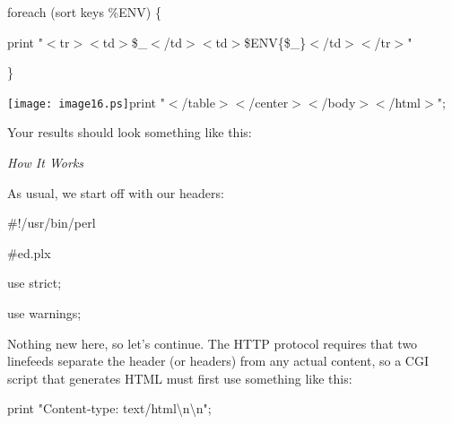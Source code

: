 \documentclass[a4paper,11pt]{book}
\begin{document}
\noindent foreach (sort keys \%ENV) \{

\noindent print "$<$tr$>$$<$td$>$\$\_$<$/td$>$$<$td$>$\$ENV\{\$\_\}$<$/td$>$$<$/tr$>$"

\noindent \}

\noindent \texttt{[image: image16.ps]}print "$<$/table$>$$<$/center$>$$<$/body$>$$<$/html$>$";

\noindent 

\noindent Your results should look something like this:

\noindent 

\noindent 

\noindent 

\noindent 

\noindent 

\noindent 

\noindent 

\noindent 

\noindent 

\noindent 

\noindent 

\noindent 

\noindent 

\noindent 

\noindent 

\noindent 

\noindent 

\noindent 

\noindent 

\noindent 

\noindent \textit{How It Works}

\noindent As usual, we start off with our headers:

\noindent 

\noindent \#!/usr/bin/perl

\noindent \#ed.plx

\noindent use strict;

\noindent use warnings;

\noindent 

\noindent Nothing new  here,  so  let's  continue.  The  HTTP  protocol  requires  that  two  linefeeds  separate  the header (or  headers)  from any  actual  content,  so  a  CGI  script  that  generates  HTML  must first use something like this:

\noindent 

\noindent print "Content-type: text/html\textbackslash n\textbackslash n";
\end{document}
